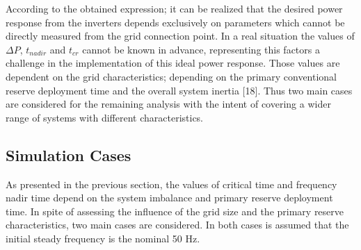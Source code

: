 
According to the obtained expression; it can be realized that the desired power response from the inverters depends exclusively on parameters which cannot be directly measured from the grid connection point. In a real situation the values of $\Delta P$, $ t_{nadir} $ and $ t_{cr} $ cannot be known in advance, representing this factors a challenge in the implementation of this ideal power response. Those values are dependent on the grid characteristics; depending on the primary conventional reserve deployment time and the overall system inertia [18]. Thus two main cases are considered for the remaining analysis with the intent of covering a wider range of systems with different characteristics.

\subsection{Simulation Cases}

As presented in the previous section, the values of critical time and frequency nadir time depend on the system imbalance and primary reserve deployment time.  In spite of assessing the influence of the grid size and the primary reserve characteristics, two main cases are considered. In both cases is assumed that the initial steady frequency is the nominal 50 Hz.


